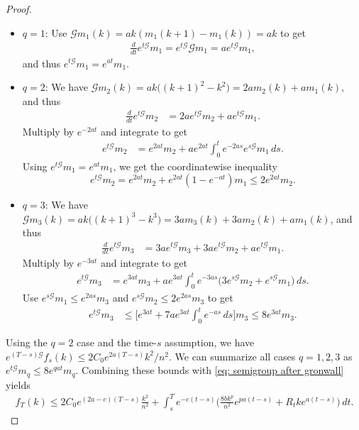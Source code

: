 \documentclass[10pt,a4paper]{amsart}
\begin{document}
\begin{proof}
\begin{itemize}
\item $q=1$: Use $\mathcal G m_1(k) = ak(m_1(k+1)-m_1(k))=ak$ to get
\begin{align*}
\frac{d}{dt}e^{t\mathcal G}m_1=e^{t\mathcal G}\mathcal Gm_1 = ae^{t\mathcal G}m_1,
\end{align*}
and thus $e^{t\mathcal G}m_1=e^{at}m_1$.
\item $q=2$: We have $\mathcal G m_2(k) = ak\big((k+1)^2-k^2\big) = 2a m_2(k) + am_1(k)$, and thus
\begin{align*}
\frac{d}{dt}e^{t\mathcal G}m_2 &= 2ae^{t\mathcal G}m_2 + a e^{t\mathcal G}m_1.
\end{align*}
Multiply by $e^{-2at}$ and integrate to get
\begin{align*}
e^{t\mathcal G}m_2 &= e^{ 2at}m_2 + ae^{2at}\int_0^t e^{-2as} e^{s\mathcal G}m_1 \,ds.
\end{align*}
Using $e^{t\mathcal G}m_1=e^{at}m_1$, we get the coordinatewise inequality
\[
e^{t\mathcal G}m_2 = e^{ 2at}m_2 + e^{2at}(1-e^{-at}) m_1 \le 2 e^{2at}m_2.
\]
\item $q=3$: We have $\mathcal G m_3(k) = ak\big((k+1)^3-k^3\big) = 3a m_3(k) + 3am_2(k) + am_1(k)$, and thus
\begin{align*}
\frac{d}{dt}e^{t\mathcal G}m_3 &= 3ae^{t\mathcal G}m_3 + 3a e^{t\mathcal G}m_2 + a e^{t\mathcal G}m_1.
\end{align*}
Multiply by $e^{-3at}$ and integrate to get
\begin{align*}
e^{t\mathcal G}m_3 &= e^{ 3at}m_3 + ae^{3at}\int_0^t e^{-3as} \big(3  e^{s\mathcal G}m_2 +   e^{s\mathcal G}m_1\big) \,ds.
\end{align*}
Use $e^{s\mathcal G}m_1\le e^{2as} m_3$ and $e^{s\mathcal G}m_2 \le 2 e^{2as}m_3$ to get
\begin{align*}
e^{t\mathcal G}m_3 &\le \bigg[e^{ 3at} + 7ae^{3at}\int_0^t e^{-as} \,ds\bigg] m_3 \le 8 e^{3at} m_3.
\end{align*}
\end{itemize}
Using the $q=2$ case and the time-$s$ assumption, we have $e^{(T-s)\mathcal G} f_s(k) \le 2C_0 e^{2a(T-s)}k^2/n^2$.
We can summarize all cases $q=1,2,3$ as $e^{t\mathcal G}m_q \le 8e^{qat}m_q$.
Combining these bounds with \eqref{eq: semigroup after gronwall} yields
\begin{align*}
f_{T}(k) \le 2C_0 e^{(2a-c)(T-s)} \frac{k^2}{n^2}  + \int_s^Te^{-c(t-s)}\Big(\frac{8bk^p}{n^2}e^{pa(t-s)}   + R_tke^{a(t-s)}\Big)\,dt.
\end{align*}
\end{proof}
\end{document}
